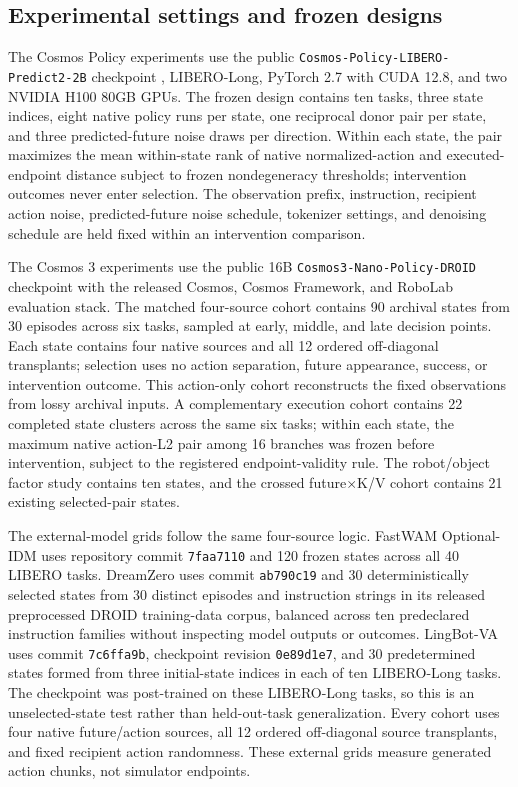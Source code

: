 \documentclass{article}
\begin{document}
\subsection{Experimental settings and frozen designs}
\label{app:settings}

The Cosmos Policy experiments use the public \texttt{Cosmos-Policy-LIBERO-Predict2-2B} checkpoint \citep{nvidia2026cosmospolicylibero}, LIBERO-Long, PyTorch 2.7 with CUDA 12.8, and two NVIDIA H100 80GB GPUs. The frozen design contains ten tasks, three state indices, eight native policy runs per state, one reciprocal donor pair per state, and three predicted-future noise draws per direction. Within each state, the pair maximizes the mean within-state rank of native normalized-action and executed-endpoint distance subject to frozen nondegeneracy thresholds; intervention outcomes never enter selection. The observation prefix, instruction, recipient action noise, predicted-future noise schedule, tokenizer settings, and denoising schedule are held fixed within an intervention comparison.

The Cosmos 3 experiments use the public 16B \texttt{Cosmos3-Nano-Policy-DROID} checkpoint with the released Cosmos, Cosmos Framework, and RoboLab evaluation stack. The matched four-source cohort contains 90 archival states from 30 episodes across six tasks, sampled at early, middle, and late decision points. Each state contains four native sources and all 12 ordered off-diagonal transplants; selection uses no action separation, future appearance, success, or intervention outcome. This action-only cohort reconstructs the fixed observations from lossy archival inputs. A complementary execution cohort contains 22 completed state clusters across the same six tasks; within each state, the maximum native action-L2 pair among 16 branches was frozen before intervention, subject to the registered endpoint-validity rule. The robot/object factor study contains ten states, and the crossed future$\times$K/V cohort contains 21 existing selected-pair states.

The external-model grids follow the same four-source logic. FastWAM Optional-IDM uses repository commit \texttt{7faa7110} and 120 frozen states across all 40 LIBERO tasks. DreamZero uses commit \texttt{ab790c19} and 30 deterministically selected states from 30 distinct episodes and instruction strings in its released preprocessed DROID training-data corpus, balanced across ten predeclared instruction families without inspecting model outputs or outcomes. LingBot-VA uses commit \texttt{7c6ffa9b}, checkpoint revision \texttt{0e89d1e7}, and 30 predetermined states formed from three initial-state indices in each of ten LIBERO-Long tasks. The checkpoint was post-trained on these LIBERO-Long tasks, so this is an unselected-state test rather than held-out-task generalization. Every cohort uses four native future/action sources, all 12 ordered off-diagonal source transplants, and fixed recipient action randomness. These external grids measure generated action chunks, not simulator endpoints.
\end{document}
